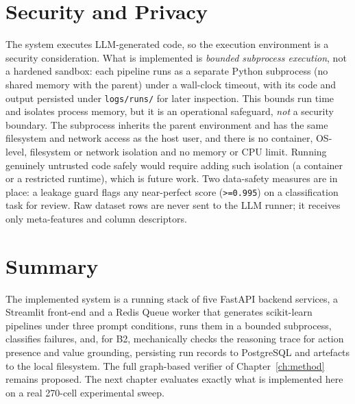 \section{Security and Privacy}

The system executes LLM-generated code, so the execution environment is
a security consideration. What is implemented is \emph{bounded subprocess
execution}, not a hardened sandbox: each pipeline runs as a separate
Python subprocess (no shared memory with the parent) under a wall-clock
timeout, with its code and output persisted under \texttt{logs/runs/}
for later inspection. This bounds run time and isolates process memory,
but it is an operational safeguard, \emph{not} a security boundary.
The subprocess inherits the parent environment and has the same
filesystem and network access as the host user, and there is no
container, OS-level, filesystem or network isolation and no memory or
CPU limit. Running genuinely untrusted code safely would require adding
such isolation (a container or a restricted runtime), which is future
work. Two data-safety measures are in place: a leakage guard flags any
near-perfect score (\texttt{>=0.995}) on a classification task for
review. Raw dataset rows are never sent to the LLM runner; it receives
only meta-features and column descriptors.

\section{Summary}

The implemented system is a running stack of five FastAPI backend
services, a Streamlit front-end and a Redis Queue worker that generates
scikit-learn pipelines under three prompt conditions, runs them in a
bounded subprocess, classifies failures, and, for B2,
mechanically checks the reasoning trace for action presence and
value grounding, persisting run records to PostgreSQL and artefacts to
the local filesystem. The
full graph-based verifier of Chapter~\ref{ch:method} remains proposed.
The next chapter evaluates exactly what is implemented here on a real
270-cell experimental sweep.
